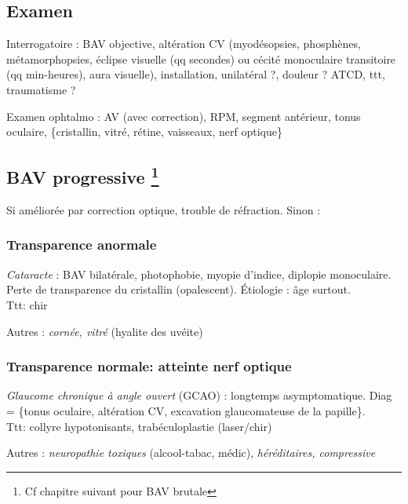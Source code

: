 \documentclass[11pt]{article}
\def\ttt{\hspace*{1cm}Ttt: }
\begin{document}
\subsection{Examen}
\label{sec:org6067a53}
Interrogatoire : BAV objective, altération CV  (myodésopsies, phosphènes,
métamorphopsies, éclipse visuelle (qq secondes) ou cécité monoculaire
transitoire (qq min-heures), aura visuelle), installation, unilatéral ?, douleur
? ATCD, ttt, traumatisme ?

Examen ophtalmo : AV (avec correction), RPM, segment antérieur, tonus oculaire,
\{cristallin, vitré, rétine, vaisseaux, nerf optique\}

\subsection{BAV progressive \footnote{Cf chapitre suivant pour BAV brutale}}
\label{sec:org80b3258}
Si améliorée par correction optique, trouble de réfraction. Sinon :

\subsubsection{Transparence anormale}
\label{sec:org101974d}
\emph{Cataracte} : BAV bilatérale, photophobie, myopie d'indice, diplopie
monoculaire. Perte de transparence du cristallin (opalescent). Étiologie : âge
surtout.\\
\ttt chir

Autres : \emph{cornée, vitré} (hyalite des uvéite)

\subsubsection{Transparence normale: atteinte nerf optique}
\label{sec:org6e8e93b}
\emph{Glaucome chronique à angle ouvert} (GCAO) : longtemps asymptomatique. Diag =
\{\inc tonus oculaire, altération CV, excavation glaucomateuse de la
papille\}. \\
\ttt collyre hypotonisants, trabéculoplastie (laser/chir)

Autres : \emph{neuropathie toxiques} (alcool-tabac, médic), \emph{héréditaires, compressive}
\end{document}
